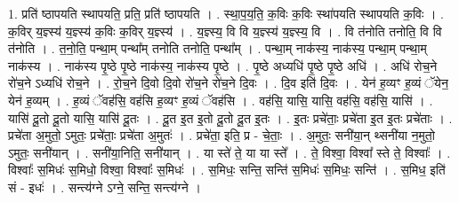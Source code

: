 \documentclass[17pt]{extarticle}
\begin{document}
1. प्रति॑ ष्ठापयति स्थापयति॒ प्रति॒ प्रति॑ ष्ठापयति । . स्था॒प॒य॒ति॒ क॒विः क॒विः स्था॑पयति स्थापयति क॒विः । . क॒विर् य॒ज्ञ्स्य॑ य॒ज्ञ्स्य॑ क॒विः क॒विर् य॒ज्ञ्स्य॑ । . य॒ज्ञ्स्य॒ वि वि य॒ज्ञ्स्य॑ य॒ज्ञ्स्य॒ वि । . वि त॑नोति तनोति॒ वि वि त॑नोति । . त॒नो॒ति॒ पन्था॒म् पन्था᳚म् तनोति तनोति॒ पन्था᳚म् । . पन्था॒म् नाक॑स्य॒ नाक॑स्य॒ पन्था॒म् पन्था॒म् नाक॑स्य । . नाक॑स्य पृ॒ष्ठे पृ॒ष्ठे नाक॑स्य॒ नाक॑स्य पृ॒ष्ठे । . पृ॒ष्ठे अध्यधि॑ पृ॒ष्ठे पृ॒ष्ठे अधि॑ । . अधि॑ रोच॒ने रो॑च॒ने ऽध्यधि॑ रोच॒ने । . रो॒च॒ने दि॒वो दि॒वो रो॑च॒ने रो॑च॒ने दि॒वः । . दि॒व इति॑ दि॒वः । . येन॑ ह॒व्यꣳ ह॒व्यं ॅयेन॒ येन॑ ह॒व्यम् । . ह॒व्यं ॅवह॑सि॒ वह॑सि ह॒व्यꣳ ह॒व्यं ॅवह॑सि । . वह॑सि॒ यासि॒ यासि॒ वह॑सि॒ वह॑सि॒ यासि॑ । . यासि॑ दू॒तो दू॒तो यासि॒ यासि॑ दू॒तः । . दू॒त इ॒त इ॒तो दू॒तो दू॒त इ॒तः । . इ॒तः प्रचे॑ताः॒ प्रचे॑ता इ॒त इ॒तः प्रचे॑ताः । . प्रचे॑ता अ॒मुतो॒ ऽमुतः॒ प्रचे॑ताः॒ प्रचे॑ता अ॒मुतः॑ । . प्रचे॑ता॒ इति॒ प्र - चे॒ताः॒ । . अ॒मुतः॒ सनी॑या॒न् थ्सनी॑या न॒मुतो॒ ऽमुतः॒ सनी॑यान् । . सनी॑या॒निति॒ सनी॑यान् । . या स्ते॑ ते॒ या या स्ते᳚ । . ते॒ विश्वा॒ विश्वा᳚ स्ते ते॒ विश्वाः᳚ । . विश्वाः᳚ स॒मिधः॑ स॒मिधो॒ विश्वा॒ विश्वाः᳚ स॒मिधः॑ । . स॒मिधः॒ सन्ति॒ सन्ति॑ स॒मिधः॑ स॒मिधः॒ सन्ति॑ । . स॒मिध॒ इति॑ सं - इधः॑ । . सन्त्य॑ग्ने ऽग्ने॒ सन्ति॒ सन्त्य॑ग्ने । \newline
\end{document}
